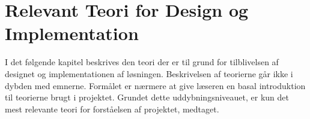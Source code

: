 \chapter{Relevant Teori for Design og Implementation}

I det følgende kapitel beskrives den teori der er til grund for tilblivelsen af designet og implementationen af løsningen. Beskrivelsen af teorierne går ikke i dybden med emnerne. Formålet er nærmere at give læseren en basal introduktion til teorierne brugt i projektet. Grundet dette uddybningsniveauet, er kun det mest relevante teori for forståelsen af projektet, medtaget.







